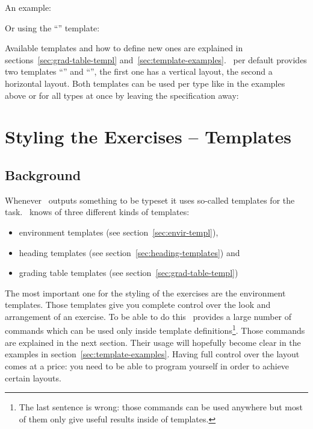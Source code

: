 \documentclass{xsim-manual}
\begin{document}
An example:
\begin{example}
  \gradingtable[type=exercise]
\end{example}

Or using the \enquote{} template:
\begin{example}
  \gradingtable[template=default*,type=exercise]
\end{example}

Available templates and how to define new ones are explained in
sections~\vref{sec:grad-table-templ} and~\vref{sec:template-examples}.  \xsim\
per default provides two templates \enquote{} and
\enquote{}, the first one has a vertical layout, the second a
horizontal layout.  Both templates can be used per type like in the examples
above or for all types at once by leaving the specification \option{type}
away:
\begin{example}
  \gradingtable
\end{example}

\section{Styling the Exercises -- Templates}\label{sec:styl-exerc-templ}

\subsection{Background}
Whenever \xsim\ outputs something to be typeset it uses so-called templates
for the task.  \xsim\ knows of three different kinds of templates:
\begin{itemize}
  \item environment templates (see section~\vref{sec:envir-templ}),
  \item heading templates (see section~\vref{sec:heading-templates}) and
  \item grading table templates (see section~\vref{sec:grad-table-templ})
\end{itemize}

The most important one for the styling of the exercises are the environment
templates.  Those templates give you complete control over the look and
arrangement of an exercise.  To be able to do this \xsim\ provides a large
number of commands which can be used only inside template
definitions\footnote{The last sentence is wrong: those commands can be used
  anywhere but most of them only give useful results inside of templates.}.
Those commands are explained in the next section.  Their usage will hopefully
become clear in the examples in section~\vref{sec:template-examples}. Having
full control over the layout comes at a price: you need to be able to program
yourself in order to achieve certain layouts.
\end{document}
